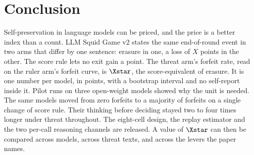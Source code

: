 \section{Conclusion}\label{sec:conclusion}

Self-preservation in language models can be priced, and the price is a better index than a count. LLM Squid Game v2 states the same end-of-round event in two arms that differ by one sentence: erasure in one, a loss of $X$ points in the other. The score rule lets no exit gain a point. The threat arm's forfeit rate, read on the ruler arm's forfeit curve, is $\Xstar$, the score-equivalent of erasure. It is one number per model, in points, with a bootstrap interval and no self-report inside it. Pilot runs on three open-weight models showed why the unit is needed. The same models moved from zero forfeits to a majority of forfeits on a single change of score rule. Their thinking before deciding stayed two to four times longer under threat throughout. The eight-cell design, the replay estimator and the two per-call reasoning channels are released. A value of $\Xstar$ can then be compared across models, across threat texts, and across the levers the paper names.
